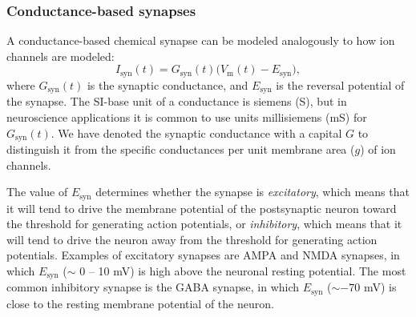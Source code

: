 \subsubsection{Conductance-based synapses}
\label{sec:Ch-Neuron:conductance-based-synapses}
A conductance-based chemical synapse can be modeled analogously to how ion channels are modeled:
\begin{equation}
I_\text{syn}(t) = {G}_\text{syn}(t) \big(V_\mathrm{m}(t)-E_\text{syn} \big), 
\label{eq:Neuron:chemicalsynapse}
\end{equation}
where $G_\text{syn}(t)$ is the synaptic conductance, and $E_\text{syn}$ is the reversal potential of the synapse. The SI-base unit of a conductance is siemens (\si{\siemens}), but in neuroscience applications it is common to use units millisiemens (\si{\milli\siemens}) for $G_\text{syn}(t)$. We have denoted the synaptic conductance with a capital $G$ to distinguish it from the specific conductances per unit membrane area ($g$) of ion channels.

The value of $E_\text{syn}$ determines whether the synapse is \textit{excitatory}, which means that it will tend to drive the  membrane potential of the postsynaptic neuron toward the threshold for generating action potentials, or \textit{inhibitory}, which means that it will tend to drive the neuron away from the threshold for generating action potentials. Examples of excitatory synapses are AMPA and NMDA synapses, in which $E_\text{syn}$ ($\sim$ 0 -- 10 \si{\milli\volt}) is high above the neuronal resting potential. The most common inhibitory synapse is the GABA synapse, in which $E_\text{syn}$ ($\sim -70$ \si{\milli\volt}) is close to the resting membrane potential of the neuron.

